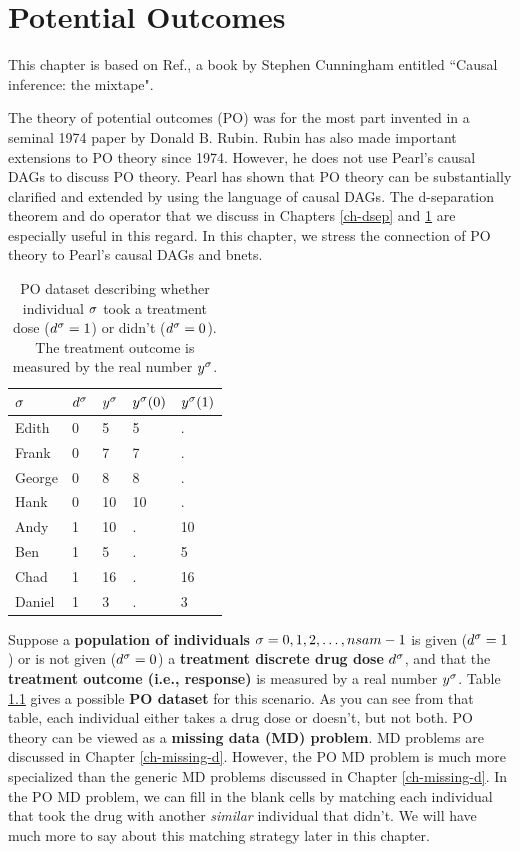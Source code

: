 \chapter{Potential Outcomes}
\label{ch-pot-out}
This chapter
is based on Ref.\cite{book-mixtape},
a book by Stephen Cunningham entitled 
``Causal inference: the mixtape".

The theory of potential
outcomes (PO) was for the most part
invented in a seminal
1974 paper by Donald B. Rubin. Rubin
has also
made important extensions
to PO theory since 1974. However, he 
does not
use Pearl's causal DAGs to discuss PO theory. 
Pearl has shown that PO theory
can be substantially clarified
and extended by using
the language of causal DAGs.
The d-separation theorem and do operator
that we discuss in  Chapters \ref{ch-dsep}
and \ref{ch-pot-out}
are especially
useful in this regard.
In this chapter, we stress the
connection
of PO theory to 
Pearl's causal DAGs
and bnets.

\begin{table}[h!]
\centering
\begin{tabular}{|l|l|l|l|l|}
\hline
\rowcolor[HTML]{ECF4FF} 
$\sigma$ & $ d^\sigma$ & $ y^\sigma$ & $ y^\sigma(0)$ & $ y^\sigma(1)$ \\ \hline
Edith & 0 & 5 & 5 & . \\ \hline
Frank & 0 & 7 & 7 & . \\ \hline
George & 0 & 8 & 8 & . \\ \hline
Hank & 0 & 10 & 10 & . \\ \hline
Andy & \cellcolor[HTML]{FFFFC7}1 & 10 & . & 10 \\ \hline
Ben & \cellcolor[HTML]{FFFFC7}1 & 5 & . & 5 \\ \hline
Chad & \cellcolor[HTML]{FFFFC7}1 & 16 & . & 16 \\ \hline
Daniel & \cellcolor[HTML]{FFFFC7}1 & 3 & . & 3 \\ \hline
\end{tabular}
\caption{PO dataset describing whether
individual $\sigma$
took a treatment dose ($d^\sigma=1$)
or didn't ($d^\sigma=0$).
The 
treatment outcome
is measured by the real number $y^\sigma$.}
\label{tab-pot-out-missing}
\end{table} 

Suppose a {\bf population
of individuals} $\sigma=0,1,2, \ldots, nsam-1$
is given ($d^\sigma=1$) or is
not given ($d^\sigma=0$)
a {\bf treatment discrete drug dose} $d^\sigma$,
and that
the 
 {\bf treatment outcome (i.e., response)}
is measured by
a real number $y^\sigma$.
Table \ref{tab-pot-out-missing}
gives a possible {\bf PO dataset}
for this scenario.
As you
can see from
that table,
each individual 
either takes a drug
dose or
doesn't,
but not both.
PO theory
can be viewed as a
 {\bf  missing
data (MD) problem}. MD problems are 
discussed in
 Chapter \ref{ch-missing-d}.
However, the PO MD problem 
is much more specialized
than the generic MD problems
discussed in Chapter \ref{ch-missing-d}.
In the PO MD
problem, we can
fill
in the blank cells
by matching
each individual
that took
the drug with
another {\it similar} 
individual that didn't.
We will have much
more to say about
this matching
strategy later in this chapter.

